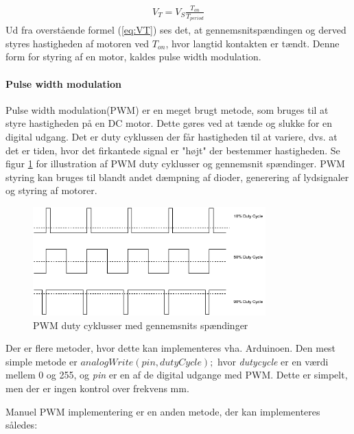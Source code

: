 \begin{align}
V_T=V_S \frac{T_{on}}{T_{period}}
\label{eq:VT}
\end{align}
Ud fra overstående formel (\ref{eq:VT}) ses det, at gennemsnitspændingen og derved styres hastigheden af motoren ved $T_{on}$, hvor langtid kontakten er tændt. Denne form for styring af en motor, kaldes pulse width modulation.



\paragraph{Pulse width modulation} \phantom{mmmmmmmmmmmmmmmmmkkkkkkkkkkkkkkkkkkkkkkkkkkkkkkkkmmmmmmmmmmmmmmmmmmmmmm}

Pulse width modulation(PWM) er en meget brugt metode, som bruges til at styre hastigheden på en DC motor. Dette gøres ved at tænde og slukke for en digital udgang. Det er duty cyklussen der får hastigheden til at variere, dvs. at det er tiden, hvor det firkantede signal er "højt" der bestemmer hastigheden. Se figur \ref{fig:pwmsignal} for illustration af PWM duty cyklusser og gennemsnit spændinger. PWM styring kan bruges til blandt andet dæmpning af dioder, generering af lydsignaler og styring af motorer. 

 \begin{figure}[H]
	\centering
	\includegraphics[width=0.8\textwidth]{billeder/Hardware/pwm.png}
	\caption{PWM duty cyklusser med gennemsnits spændinger}
	\label{fig:pwmsignal}
\end{figure}

Der er flere metoder, hvor dette kan implementeres vha. Arduinoen. Den mest simple metode er $analogWrite(pin, dutyCycle);$ hvor \textit{dutycycle} er en værdi mellem 0 og 255, og \textit{pin} er en af de digital udgange med PWM. Dette er simpelt, men der er ingen kontrol over frekvens mm. 

Manuel PWM implementering er en anden metode, der kan implementeres således:


